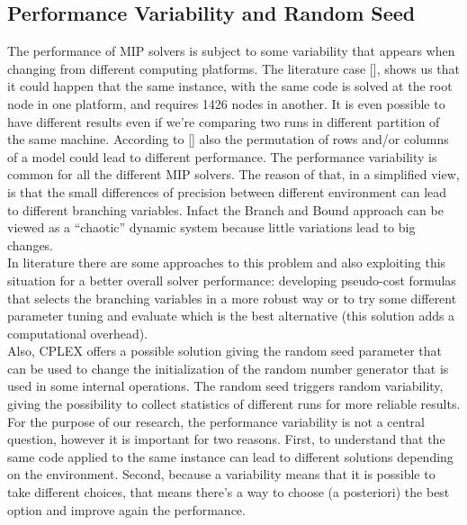 \begin{appendices}
\chapter{Performance Variability and Random Seed}
The performance of MIP solvers is subject to some variability that appears when changing from different computing platforms. The literature case [\cite{danna2008performance}], shows us that it could happen that the same instance, with the same code is solved at the root node in one platform, and requires 1426 nodes in another. It is even possible to have different results even if we’re comparing two runs in different partition of the same machine. According to [\cite{lodi2013performance}] also the permutation of rows and/or columns of a model could lead to different performance. The performance variability is common for all the different MIP solvers. 
The reason of that, in a simplified view, is that the small differences of precision between different environment can lead to different branching variables. Infact the Branch and Bound approach can be viewed as a “chaotic” dynamic system because little variations lead to big changes. \\
In literature there are some approaches to this problem and also exploiting this situation for a better overall solver performance: developing pseudo-cost formulas that selects the branching variables in a more robust way or to try some different parameter tuning and evaluate which is the best alternative (this solution adds a computational overhead). \\
Also, CPLEX offers a possible solution giving the random seed parameter that can be used to change the initialization of the random number generator that is used in some internal operations. The random seed triggers random variability, giving the possibility to collect statistics of different runs for more reliable results. \\
For the purpose of our research, the performance variability is not a central question, however it is important for two reasons. First, to understand that the same code applied to the same instance can lead to different solutions depending on the environment. Second, because a variability means that it is possible to take different choices, that means there’s a way to choose (a posteriori) the best option and improve again the performance. 



\end{appendices}



